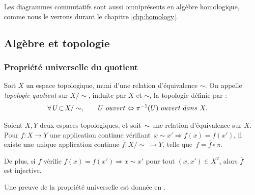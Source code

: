 Les diagrammes commutatifs sont aussi omniprésents en algèbre homologique, comme nous le verrons durant le chapitre \ref{chp:homology}.

\subsection{Algèbre et topologie}

\subsubsection{Propriété universelle du quotient}

\begin{definition}
Soit $X$ un espace topologique, muni d'une relation d'équivalence $\sim$. On appelle \emph{topologie quotient} sur $X/\!\sim$, induite par $X$ et $\sim$, la topologie définie par :\[\forall\, U\!\subset\! X/\sim,\qquad U\ ouvert\Leftrightarrow\pi\inv(U)\ ouvert\ dans \ X.\]
\end{definition}

\begin{theorem}\label{th:quotient}
Soient $X,Y$ deux espaces topologiques, et soit~$\sim$ une relation d'équivalence sur $X$. Pour $f:X\to Y$ une application continue vérifiant~${x\sim x'\Rightarrow f(x)=f(x')}$, il existe une unique application continue $\overline{f}:X/\!\sim\ \longrightarrow Y$, telle que~$f=\overline{f}\circ \pi$.

De plus, si $f$ vérifie $f(x)=f(x')\Rightarrow x\sim x'$ pour tout $(x,x')\in X^2$, alors $\overline{f}$ est injective.
\end{theorem}

Une preuve de la propriété universelle est donnée en \cite{Homeo-article}.